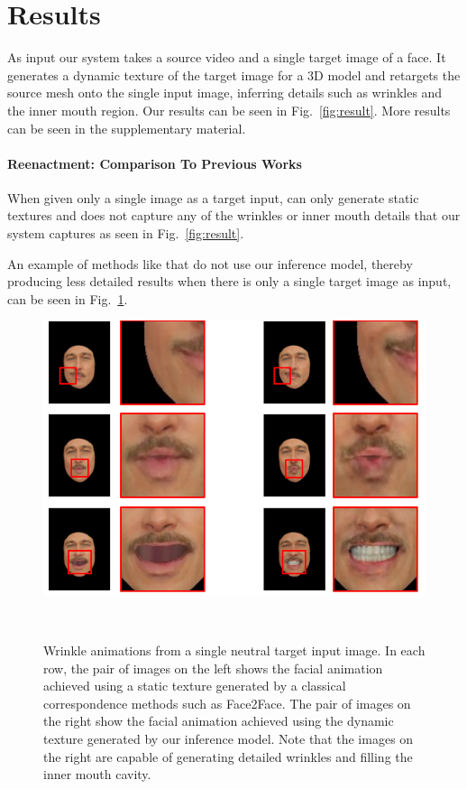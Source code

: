 \section{Results}

As input our system takes a source video and a single target image of a face. It generates a dynamic texture of the target image for a 3D model and retargets the source mesh onto the single input image, inferring details such as wrinkles and the inner mouth region.  Our results can be seen in Fig.~\ref{fig:result}. More results can be seen in the supplementary material.


\paragraph{Reenactment: Comparison To Previous Works}

When given only a single image as a target input, \cite{f2f} can only generate static textures and does not capture any of the wrinkles or inner mouth details that our system captures as seen in Fig.~\ref{fig:result}. 

An example of methods like \cite{f2f} that do not use our inference model, thereby producing less detailed results when there is only a single target image as input, can be seen in Fig.~\ref{fig:wrinkles}.


\begin{figure}[th]
	\centering
	\includegraphics[width=1.0\linewidth]{figures/wrinkles/example_crop.png}
	\caption{Wrinkle animations from a single neutral target input image. In each row, the pair of images on the left shows the facial animation achieved using a static texture generated by a classical correspondence methods such as Face2Face. The pair of images on the right show the facial animation achieved using the dynamic texture generated by our inference model. Note that the images on the right are capable of generating detailed wrinkles and filling the inner mouth cavity.}~\label{fig:wrinkles}
	\vspace{-0.2in}
\end{figure}
